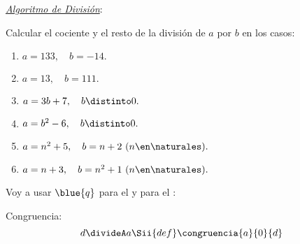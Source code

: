 \textit{\underline{Algoritmo de División}}:\par

\begin{enunciado}{\ejercicio}
  Calcular el cociente y el resto de la división de $a$ por $b$ en los casos:
  \begin{multicols}{2}
    \begin{enumerate}[label=\alph*)]
      \item $a =133,\quad b = -14.$
      \item $a =13,\quad b = 111.$
      \item $a =3b+7,    \quad b \distinto 0.$
      \item $a = b^2 - 6,\quad b \distinto 0.$
      \item $a = n^2 + 5,\quad b = n+2 \ (n \en \naturales).$
      \item $a = n + 3,   \quad b = n^2 + 1 \ (n \en \naturales).$
    \end{enumerate}
  \end{multicols}
\end{enunciado}

Voy a usar $\blue{q}$ para el  y  para el :

Congruencia:
        $$
          d \divideA a
          \Sii{def} \congruencia{a}{0}{d}
        $$

